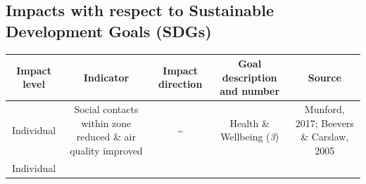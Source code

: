 \documentclass[
]{book}
\begin{document}
\hypertarget{impacts-with-respect-to-sustainable-development-goals-sdgs-8}{%
\subsection*{Impacts with respect to Sustainable Development Goals (SDGs)}\label{impacts-with-respect-to-sustainable-development-goals-sdgs-8}}

\begin{longtable}[]{@{}ccccc@{}}
\toprule
\begin{minipage}[b]{0.17\columnwidth}\centering
Impact level\strut
\end{minipage} & \begin{minipage}[b]{0.16\columnwidth}\centering
Indicator\strut
\end{minipage} & \begin{minipage}[b]{0.17\columnwidth}\centering
Impact direction\strut
\end{minipage} & \begin{minipage}[b]{0.17\columnwidth}\centering
Goal description and number\strut
\end{minipage} & \begin{minipage}[b]{0.17\columnwidth}\centering
Source\strut
\end{minipage}\tabularnewline
\midrule
\endhead
\begin{minipage}[t]{0.17\columnwidth}\centering
Individual\strut
\end{minipage} & \begin{minipage}[t]{0.16\columnwidth}\centering
Social contacts within zone reduced \& air quality improved\strut
\end{minipage} & \begin{minipage}[t]{0.17\columnwidth}\centering
\textbf{\textasciitilde{}}\strut
\end{minipage} & \begin{minipage}[t]{0.17\columnwidth}\centering
Health \& Wellbeing (\emph{3})\strut
\end{minipage} & \begin{minipage}[t]{0.17\columnwidth}\centering
Munford, 2017; Beevers \& Carslaw, 2005\strut
\end{minipage}\tabularnewline
\begin{minipage}[t]{0.17\columnwidth}\centering
Individual\strut
\end{minipage} & \begin{minipage}[t]{0.16\columnwidth}\centering

\end{minipage}
\end{longtable}
\end{document}
